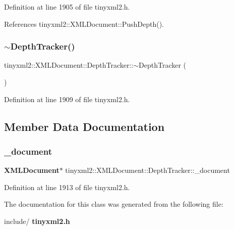 Definition at line 1905 of file tinyxml2.\+h.



References tinyxml2\+::\+X\+M\+L\+Document\+::\+Push\+Depth().

\mbox{\label{classtinyxml2_1_1_x_m_l_document_1_1_depth_tracker_a0a5bde3f2443c73b833852c43dd2b1d6}} 
\subsubsection{$\sim$DepthTracker()}
{\footnotesize\ttfamily tinyxml2\+::\+X\+M\+L\+Document\+::\+Depth\+Tracker\+::$\sim$\+Depth\+Tracker (\begin{DoxyParamCaption}{ }\end{DoxyParamCaption})\hspace{0.3cm}{\ttfamily [inline]}}



Definition at line 1909 of file tinyxml2.\+h.



\subsection{Member Data Documentation}
\mbox{\label{classtinyxml2_1_1_x_m_l_document_1_1_depth_tracker_ab142a47709c83a3698af1470378b9385}} 
\subsubsection{\_document}
{\footnotesize\ttfamily \textbf{ X\+M\+L\+Document}$\ast$ tinyxml2\+::\+X\+M\+L\+Document\+::\+Depth\+Tracker\+::\+\_\+document\hspace{0.3cm}{\ttfamily [private]}}



Definition at line 1913 of file tinyxml2.\+h.



The documentation for this class was generated from the following file\+:\begin{DoxyCompactItemize}
\item 
include/\textbf{ tinyxml2.\+h}\end{DoxyCompactItemize}
